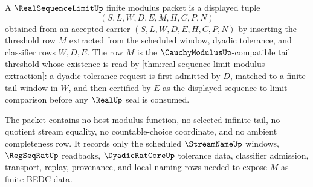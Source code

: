 \begin{definition}\label{def:real-sequence-limit-modulus-carrier}
A $\RealSequenceLimitUp$ finite modulus packet is a displayed tuple
$$
(S,L,W,D,E,M,H,C,P,N)
$$
obtained from an accepted carrier $(S,L,W,D,E,H,C,P,N)$ by inserting the threshold row $M$ extracted from the scheduled window, dyadic tolerance, and classifier rows $W,D,E$. The row $M$ is the $\CauchyModulusUp$-compatible tail threshold whose existence is read by \autoref{thm:real-sequence-limit-modulus-extraction}: a dyadic tolerance request is first admitted by $D$, matched to a finite tail window in $W$, and then certified by $E$ as the displayed sequence-to-limit comparison before any $\RealUp$ seal is consumed.

The packet contains no host modulus function, no selected infinite tail, no quotient stream equality, no countable-choice coordinate, and no ambient completeness row. It records only the scheduled $\StreamNameUp$ windows, $\RegSeqRatUp$ readbacks, $\DyadicRatCoreUp$ tolerance data, classifier admission, transport, replay, provenance, and local naming rows needed to expose $M$ as finite BEDC data.
\end{definition}

